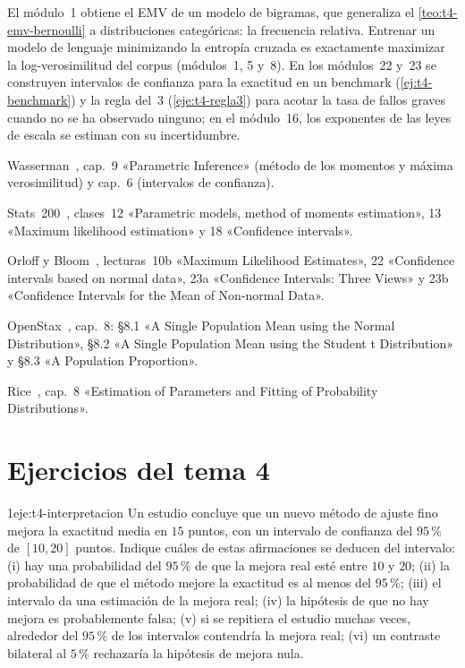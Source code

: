 \begin{observacion}
El módulo~1 obtiene el EMV de un modelo de bigramas, que generaliza el \cref{teo:t4-emv-bernoulli} a distribuciones categóricas: la frecuencia relativa. Entrenar un modelo de lenguaje minimizando la entropía cruzada es exactamente maximizar la log-verosimilitud del corpus (módulos~1, 5 y~8). En los módulos~22 y~23 se construyen intervalos de confianza para la exactitud en un benchmark (\cref{ej:t4-benchmark}) y la regla del~3 (\cref{eje:t4-regla3}) para acotar la tasa de fallos graves cuando no se ha observado ninguno; en el módulo~16, los exponentes de las leyes de escala se estiman con su incertidumbre.
\end{observacion}

\begin{lecturas}
\item Wasserman~\cite{wasserman}, cap.~9 «Parametric Inference» (método de los momentos y máxima verosimilitud) y cap.~6 (intervalos de confianza).
\item Stats~200~\cite{stats200}, clases~12 «Parametric models, method of moments estimation», 13 «Maximum likelihood estimation» y 18 «Confidence intervals».
\item Orloff y Bloom~\cite{mit1805}, lecturas~10b «Maximum Likelihood Estimates», 22 «Confidence intervals based on normal data», 23a «Confidence Intervals: Three Views» y 23b «Confidence Intervals for the Mean of Non-normal Data».
\item OpenStax~\cite{openstax}, cap.~8: §8.1 «A Single Population Mean using the Normal Distribution», §8.2 «A Single Population Mean using the Student t Distribution» y §8.3 «A Population Proportion».
\item Rice~\cite{rice}, cap.~8 «Estimation of Parameters and Fitting of Probability Distributions».
\end{lecturas}

\section*{Ejercicios del tema 4}

\begin{ejercicio}{1}{eje:t4-interpretacion}
Un estudio concluye que un nuevo método de ajuste fino mejora la exactitud media en $15$ puntos, con un intervalo de confianza del $95\,\%$ de $[10,20]$ puntos. Indique cuáles de estas afirmaciones se deducen del intervalo: (i) hay una probabilidad del $95\,\%$ de que la mejora real esté entre $10$ y $20$; (ii) la probabilidad de que el método mejore la exactitud es al menos del $95\,\%$; (iii) el intervalo da una estimación de la mejora real; (iv) la hipótesis de que no hay mejora es probablemente falsa; (v) si se repitiera el estudio muchas veces, alrededor del $95\,\%$ de los intervalos contendría la mejora real; (vi) un contraste bilateral al $5\,\%$ rechazaría la hipótesis de mejora nula.
\end{ejercicio}

